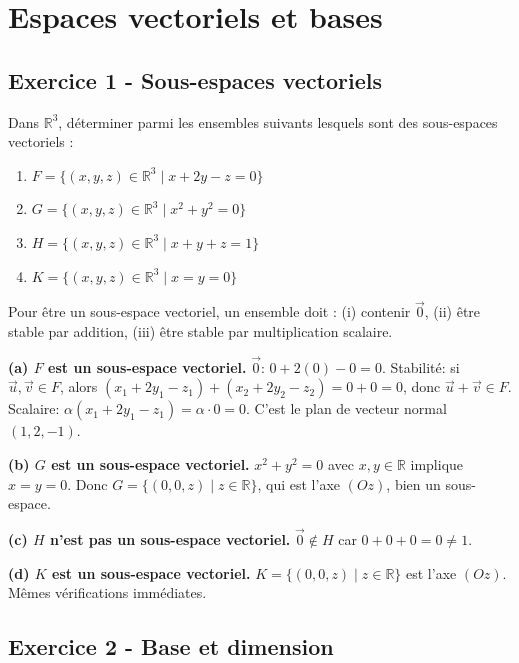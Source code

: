 \documentclass[12pt,a4paper]{article}
\begin{document}
\newpage
\section{Espaces vectoriels et bases}

\subsection*{Exercice 1 - Sous-espaces vectoriels \niveau{\facile}}

\begin{boiteexercice}
Dans $\mathbb{R}^3$, déterminer parmi les ensembles suivants lesquels sont des sous-espaces vectoriels :
\begin{enumerate}[label=(\alph*)]
  \item $F = \{(x,y,z)\in\mathbb{R}^3 \mid x + 2y - z = 0\}$
  \item $G = \{(x,y,z)\in\mathbb{R}^3 \mid x^2 + y^2 = 0\}$
  \item $H = \{(x,y,z)\in\mathbb{R}^3 \mid x + y + z = 1\}$
  \item $K = \{(x,y,z)\in\mathbb{R}^3 \mid x = y = 0\}$
\end{enumerate}
\end{boiteexercice}

\begin{boitecorrige}
Pour être un sous-espace vectoriel, un ensemble doit : (i) contenir $\vec{0}$, (ii) être stable par addition, (iii) être stable par multiplication scalaire.

\textbf{(a) $F$ est un sous-espace vectoriel.}
$\vec{0}$: $0+2(0)-0=0$. Stabilité: si $\vec{u},\vec{v}\in F$, alors $(x_1+2y_1-z_1)+(x_2+2y_2-z_2)=0+0=0$, donc $\vec{u}+\vec{v}\in F$. Scalaire: $\alpha(x_1+2y_1-z_1)=\alpha\cdot0=0$. C'est le plan de vecteur normal $(1,2,-1)$.

\textbf{(b) $G$ est un sous-espace vectoriel.}
$x^2+y^2=0$ avec $x,y\in\mathbb{R}$ implique $x=y=0$. Donc $G=\{(0,0,z)\mid z\in\mathbb{R}\}$, qui est l'axe $(Oz)$, bien un sous-espace.

\textbf{(c) $H$ n'est pas un sous-espace vectoriel.}
$\vec{0}\notin H$ car $0+0+0=0\neq1$.

\textbf{(d) $K$ est un sous-espace vectoriel.}
$K=\{(0,0,z)\mid z\in\mathbb{R}\}$ est l'axe $(Oz)$. Mêmes vérifications immédiates.
\end{boitecorrige}

\subsection*{Exercice 2 - Base et dimension \niveau{\facile}}
\end{document}
